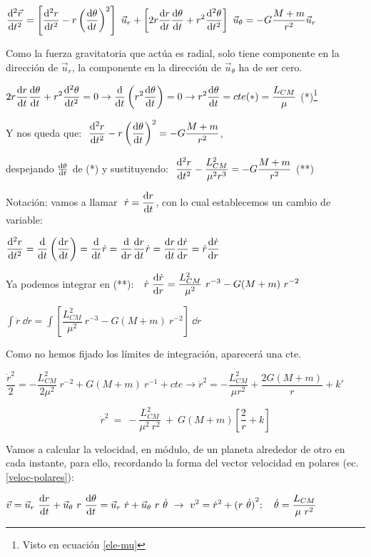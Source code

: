 $\displaystyle \dv[2]{\vec r}{t}=\left[ \dv[2]{r}{t}-r\left( \dv{\theta}{t}\right)^2  \right]\ \vec u_r + \left[ 2r \dv{r}{t} \dv{\theta}{t}+r^2\dv[2]{\theta}{t}  \right] \ \vec u_\theta = - G \dfrac{M+m}{r^2} \vec u_r$

Como la fuerza gravitatoria que actúa es radial, solo tiene componente en la dirección de $\vec u_r$, la componente en la dirección de $\vec u_\theta$ ha de ser cero.

$\displaystyle 2r \dv{r}{t} \dv{\theta}{t}+r^2\dv[2]{\theta}{t}=0  \to  \dv{t} \left( r^2 \dv{\theta}{t} \right) =0  \to  r^2 \dv{\theta}{t}=cte(*)=\dfrac{L_{CM}}{\mu}$ 
(*)\footnote{Visto en ecuación \ref{ele-mu}}

Y nos queda que:  $\ \displaystyle  \dv[2]{r}{t}-r\left( \dv{\theta}{t}\right)^2=- G \dfrac{M+m}{r^2}$, 

despejando $\dv {\theta}{t}$ de (*) y sustituyendo:
$\ \displaystyle \dv[2]{r}{t} -\dfrac{L^2_{CM}}{\mu^2r^3}=-G\dfrac{M+m}{r^2}$ (**)

Notación: vamos a llamar $\ \displaystyle \dot{r}=\dv{r}{t}$, con lo cual establecemos un cambio de variable:

$\displaystyle \dv[2]{r}{t}=
\dv{t} \left( \dv{r}{t} \right)=\dv{t} \dot{r} =
\dv{r} \dv{r}{t} \dot{r}=
\dv{r}{t} \dv{\dot{r}}{r}=
\dot{r}\dv{\dot{r}}{r}$

Ya podemos integrar en (**): $\ \ \displaystyle \dot{r} \ \dv{\dot{r}}{r}=\dfrac{L^2_{CM}}{\mu^2} \ r^{-3}-G(M+m) \ r^{-2}$

$\displaystyle \int \dot{r}\  \dd \dot{r}=\int \left[ \dfrac{L^2_{CM}}{\mu^2} \ r^{-3}-G(M+m) \ r^{-2} \right] \ \dd r$

Como no hemos fijado los límites de integración, aparecerá una cte.

$\displaystyle \dfrac {{\dot{r}}^2}{2}=-\dfrac{L^2_{CM}}{2\mu^2} \ r^{-2} + G(M+m)\ r^{-1}+cte \to {\dot{r}}^2 =-\dfrac{L^2_{CM}}{\mu r^2}  + \dfrac{2G(M+m)}{r}  +k'$

\begin{equation}
	\label{r-punto-cuadrado}
	{\dot{r}}^2 \ =\ -\dfrac{L^2_{CM}}{\mu^2 \ r^2}  \ +\  G(M+m) \left[ \dfrac 2 r +k \right]
\end{equation}

Vamos a calcular la velocidad, en módulo, de un planeta alrededor de otro en cada instante, para ello, recordando la forma del vector velocidad en polares (ec. \ref{veloc-polares}):

$\displaystyle \vec v= \vec u_r \ \dv{r}{t}+ \vec u_\theta \ r \ \dv{\theta}{t}=\vec u_r \ \dot{r}+ \vec u_\theta \ r\  \dot{\theta} \ \to \ v^2={\dot{r}}^2+{(r \ \dot{\theta})}^2; \quad \dot{\theta}=\dfrac{L_{CM}}{\mu\ r^2}$

